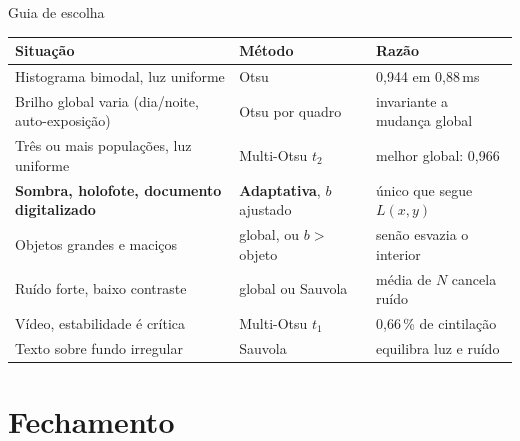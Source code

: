 \documentclass[aspectratio=169,12pt]{beamer}
\begin{document}
\begin{frame}{Guia de escolha}

  \footnotesize
  \begin{center}
  \begin{tabular}{@{}E{.42\textwidth}E{.25\textwidth}E{.27\textwidth}@{}}
    \toprule
    \textbf{Situação} & \textbf{Método} & \textbf{Razão} \\
    \midrule
    Histograma bimodal, luz uniforme & \textcolor{cOtsu}{Otsu} & 0,944 em 0,88\,ms \\
    Brilho global varia (dia/noite, auto-exposição) & \textcolor{cOtsu}{Otsu} por quadro & invariante a mudança global \\
    Três ou mais populações, luz uniforme & \textcolor{cMulti}{Multi-Otsu $t_2$} & melhor global: 0,966 \\
    \textbf{Sombra, holofote, documento digitalizado} & \textcolor{cAdapt}{\textbf{Adaptativa}}, $b$ ajustado & único que segue $L(x,y)$ \\
    Objetos grandes e maciços & global, ou $b >$ objeto & senão esvazia o interior \\
    Ruído forte, baixo contraste & \textcolor{cOtsu}{global} ou \textcolor{cAdapt}{Sauvola} & média de $N$ cancela ruído \\
    Vídeo, estabilidade é crítica & \textcolor{cMulti}{Multi-Otsu $t_1$} & 0,66\,\% de cintilação \\
    Texto sobre fundo irregular & \textcolor{cAdapt}{Sauvola} & equilibra luz e ruído \\
    \bottomrule
  \end{tabular}
  \end{center}

\end{frame}

\section{Fechamento}
\end{document}
